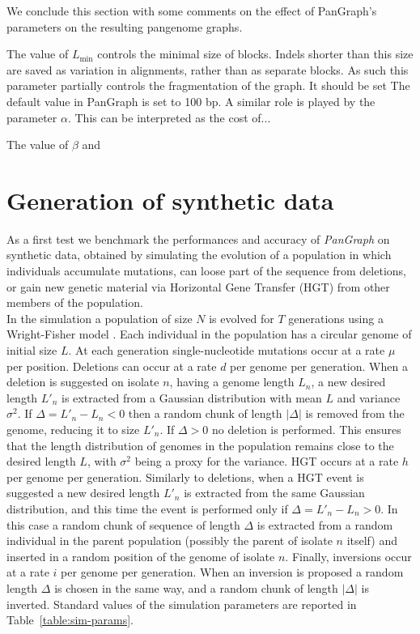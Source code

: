 \documentclass[aps,rmp,reprint,superscriptaddress,notitlepage,10pt,onecolumn]{revtex4-1}
\newcommand{\Lthr}{L_{\min}}
\begin{document}
We conclude this section with some comments on the effect of PanGraph's parameters on the resulting pangenome graphs.

The value of $\Lthr$ controls the minimal size of blocks. Indels shorter than this size are saved as variation in alignments, rather than as separate blocks. As such this parameter partially controls the fragmentation of the graph. It should be set
The default value in PanGraph is set to 100 bp.
A similar role is played by the parameter $\alpha$. This can be interpreted as the cost of...

The value of $\beta$ and


\section{Generation of synthetic data}
\label{supp:data_generation}

As a first test we benchmark the performances and accuracy of \textit{PanGraph} on synthetic data, obtained by simulating the evolution of a population in which individuals accumulate mutations, can loose part of the sequence from deletions, or gain new genetic material via Horizontal Gene Transfer (HGT) from other members of the population.\\
In the simulation a population of size $N$ is evolved for $T$ generations using a Wright-Fisher model \cite{hudson2002generating}. Each individual in the population has a circular genome of initial size $L$. At each generation single-nucleotide mutations occur at a rate $\mu$ per position. Deletions can occur at a rate $d$ per genome per generation. When a deletion is suggested on isolate $n$, having a genome length $L_n$, a new desired length $L'_n$ is extracted from a Gaussian distribution with mean $L$ and variance $\sigma^2$. If $\Delta = L'_n - L_n < 0$ then a random chunk of length $|\Delta|$ is removed from the genome, reducing it to size $L'_n$. If $\Delta > 0$ no deletion is performed. This ensures that the length distribution of genomes in the population remains close to the desired length $L$, with $\sigma^2$ being a proxy for the variance.
HGT occurs at a rate $h$ per genome per generation. Similarly to deletions, when a HGT event is suggested a new desired length $L'_n$ is extracted from the same Gaussian distribution, and this time the event is performed only if $\Delta = L'_n - L_n > 0$. In this case a random chunk of sequence of length $\Delta$ is extracted from a random individual in the parent population (possibly the parent of isolate $n$ itself) and inserted in a random position of the genome of isolate $n$.
Finally, inversions occur at a rate $i$ per genome per generation. When an inversion is proposed a random length $\Delta$ is chosen in the same way, and a random chunk of length $|\Delta|$ is inverted.
Standard values of the simulation parameters are reported in Table~\ref{table:sim-params}.
\end{document}
